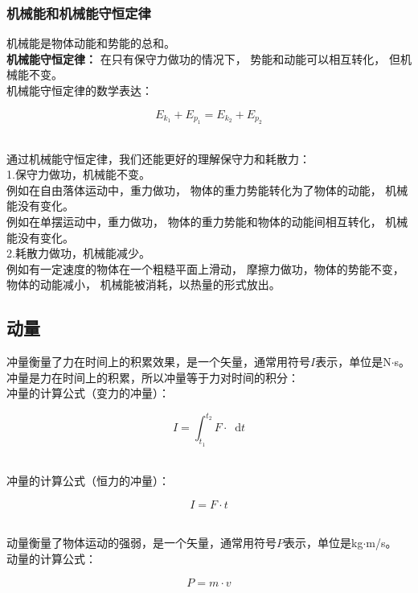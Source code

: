 \documentclass[UTF8]{ctexart}
\newcommand*{\dif}{\mathop{}\!\mathrm{d}}
\begin{document}
\subsubsection{机械能和机械能守恒定律}
    机械能是物体动能和势能的总和。\\[3mm]
    \textbf{机械能守恒定律：}
    在只有保守力做功的情况下，
    势能和动能可以相互转化，
    但机械能不变。\\[3mm]
    机械能守恒定律的数学表达：
    \begin{large}
        \begin{equation*}
            E_{k_1}+E_{p_1}=E_{k_2}+E_{p_2}
        \end{equation*}
    \end{large}\\
    通过机械能守恒定律，我们还能更好的理解保守力和耗散力：\\[4mm]
    1.保守力做功，机械能不变。\\[2mm]
    例如在自由落体运动中，重力做功，
    物体的重力势能转化为了物体的动能，
    机械能没有变化。\\[3mm]
    例如在单摆运动中，重力做功，
    物体的重力势能和物体的动能间相互转化，
    机械能没有变化。\\[4mm]
    2.耗散力做功，机械能减少。\\[2mm]
    例如有一定速度的物体在一个粗糙平面上滑动，
    摩擦力做功，物体的势能不变，物体的动能减小，
    机械能被消耗，以热量的形式放出。

\newpage

\subsection{动量}
    冲量衡量了力在时间上的积累效果，是一个矢量，通常用符号$I$表示，单位是N$\cdot$s。\\[3mm]
    冲量是力在时间上的积累，所以冲量等于力对时间的积分：\\[3mm]
    冲量的计算公式（变力的冲量）：
    \begin{large}
        \begin{equation*}
            I=\int_{t_1}^{t_2}F\cdot\dif t
        \end{equation*}
    \end{large}\\
    冲量的计算公式（恒力的冲量）：
    \begin{large}
        \begin{equation*}
            I=F\cdot t
        \end{equation*}
    \end{large}\\
    动量衡量了物体运动的强弱，是一个矢量，通常用符号$P$表示，单位是kg$\cdot$m/s。\\[3mm]
    动量的计算公式：
    \begin{large}
        \begin{equation*}
            P=m\cdot v
        \end{equation*}
    \end{large}
    \vspace{-10pt}
    
\end{document}
